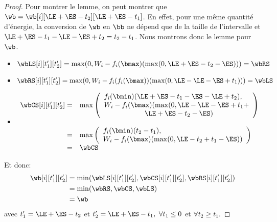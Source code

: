\begin{proof}
  Pour montrer le lemme, on peut montrer que $ \wb=
  \wb[i][\LE+\ES-t_2][\LE +\ES -t_1]$. En effet, pour une même quantité
  d'énergie, la conversion de $\wb$ en $\bb$ ne dépend que de la
  taille de l'intervalle et $\LE +\ES -t_1 - \LE - \ES+t_2 =t_2 -
  t_1$. Nous montrons donc le lemme pour $\wb$.

  \begin{itemize}
  \item $\wbLS[i][t_1'][t_2']=\max(0,W_i-f_i(\bmax)(\max(0,\LE+\ES-t_2-\ES)))=\wbRS$
    \vspace{0.2cm}
  \item $\wbRS[i][t_1'][t_2']=\max(0,W_i-f_i(f_i(\bmax))(\max(0,\LE-\LE-\ES+t_1)))=\wbLS$
  \item$
    \begin{array}{rl}
      \wbCS[i][t_1'][t_2']=&\max\left(
                             \begin{array}{l}
                               f_i(\bmin) (\LE+\ES-t_1 - \ES- \LE + t_2),\\
                               W_i - f_i(\bmax)(\max(0,\LE - \LE -\ES +t_1+\\
                               \hspace{2cm}\LE +\ES - t_2 - \ES)
                             \end{array}
      \right)\\
                           & \\
      = &\max\left(
          \begin{array}{l}
            f_i(\bmin) (t_2-t_1),\\
            W_i - f_i(\bmax)(\max(0,\LE-t_2 +t_1 - \ES))
          \end{array}
      \right)\\
      = & \wbCS
    \end{array}$
  \end{itemize}
  Et donc: 
  \begin{align*}
    \wb[i][t_1'][t_2'] &=
                         \min(\wbLS[i][t_1'][t_2'],\wbCS[i][t_1'][t_2'],\wbRS[i][t_1'][t_2'])
    \\
                       & =\min(\wbRS,\wbCS,\wbLS)\\
                       & =\wb 
  \end{align*}
  avec $t_1'=\LE+\ES-t_2$ et
  $t_2'=\LE+\ES-t_1,\ \forall t_1 \le 0$ et $\forall t_2 \ge t_1$.
\end{proof}

